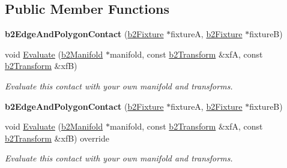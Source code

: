 \subsection*{Public Member Functions}
\begin{DoxyCompactItemize}
\item 
\mbox{\label{classb2EdgeAndPolygonContact_a79d9b012c4a0df7d5c3dcecd33df7d5f}} 
{\bfseries b2\+Edge\+And\+Polygon\+Contact} (\hyperlink{classb2Fixture}{b2\+Fixture} $\ast$fixtureA, \hyperlink{classb2Fixture}{b2\+Fixture} $\ast$fixtureB)
\item 
\mbox{\label{classb2EdgeAndPolygonContact_a5f360f5f0b1d367beb517ba9f380c84b}} 
void \hyperlink{classb2EdgeAndPolygonContact_a5f360f5f0b1d367beb517ba9f380c84b}{Evaluate} (\hyperlink{structb2Manifold}{b2\+Manifold} $\ast$manifold, const \hyperlink{structb2Transform}{b2\+Transform} \&xfA, const \hyperlink{structb2Transform}{b2\+Transform} \&xfB)
\begin{DoxyCompactList}\small\item\em Evaluate this contact with your own manifold and transforms. \end{DoxyCompactList}\item 
\mbox{\label{classb2EdgeAndPolygonContact_a79d9b012c4a0df7d5c3dcecd33df7d5f}} 
{\bfseries b2\+Edge\+And\+Polygon\+Contact} (\hyperlink{classb2Fixture}{b2\+Fixture} $\ast$fixtureA, \hyperlink{classb2Fixture}{b2\+Fixture} $\ast$fixtureB)
\item 
\mbox{\label{classb2EdgeAndPolygonContact_ae99fba8c1cb7e5d7c11ab78ca80e775d}} 
void \hyperlink{classb2EdgeAndPolygonContact_ae99fba8c1cb7e5d7c11ab78ca80e775d}{Evaluate} (\hyperlink{structb2Manifold}{b2\+Manifold} $\ast$manifold, const \hyperlink{structb2Transform}{b2\+Transform} \&xfA, const \hyperlink{structb2Transform}{b2\+Transform} \&xfB) override
\begin{DoxyCompactList}\small\item\em Evaluate this contact with your own manifold and transforms. \end{DoxyCompactList}\end{DoxyCompactItemize}
